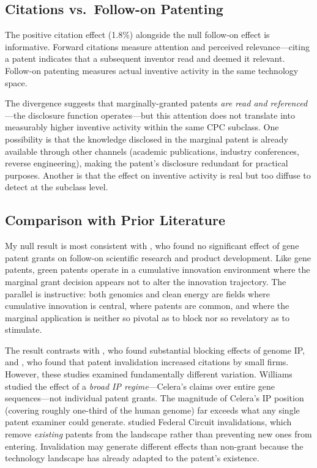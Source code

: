 \documentclass[12pt]{article}
\begin{document}
\subsection{Citations vs.\ Follow-on Patenting}

The positive citation effect (1.8\%) alongside the null follow-on effect is informative. Forward citations measure attention and perceived relevance---citing a patent indicates that a subsequent inventor read and deemed it relevant. Follow-on patenting measures actual inventive activity in the same technology space.

The divergence suggests that marginally-granted patents \emph{are read and referenced}---the disclosure function operates---but this attention does not translate into measurably higher inventive activity within the same CPC subclass. One possibility is that the knowledge disclosed in the marginal patent is already available through other channels (academic publications, industry conferences, reverse engineering), making the patent's disclosure redundant for practical purposes. Another is that the effect on inventive activity is real but too diffuse to detect at the subclass level.

\subsection{Comparison with Prior Literature}

My null result is most consistent with \citet{sampat2019}, who found no significant effect of gene patent grants on follow-on scientific research and product development. Like gene patents, green patents operate in a cumulative innovation environment where the marginal grant decision appears not to alter the innovation trajectory. The parallel is instructive: both genomics and clean energy are fields where cumulative innovation is central, where patents are common, and where the marginal application is neither so pivotal as to block nor so revelatory as to stimulate.

The result contrasts with \citet{williams2013}, who found substantial blocking effects of genome IP, and \citet{galasso2015}, who found that patent invalidation increased citations by small firms. However, these studies examined fundamentally different variation. Williams studied the effect of a \emph{broad IP regime}---Celera's claims over entire gene sequences---not individual patent grants. The magnitude of Celera's IP position (covering roughly one-third of the human genome) far exceeds what any single patent examiner could generate. \citet{galasso2015} studied Federal Circuit invalidations, which remove \emph{existing} patents from the landscape rather than preventing new ones from entering. Invalidation may generate different effects than non-grant because the technology landscape has already adapted to the patent's existence.
\end{document}

